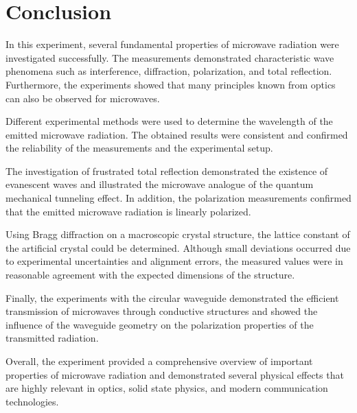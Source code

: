 \section{Conclusion}
\noindent
\setlength{\parindent}{0pt}


In this experiment, several fundamental properties of microwave radiation were investigated successfully. 
The measurements demonstrated characteristic wave phenomena such as interference, diffraction, polarization, 
and total reflection. Furthermore, the experiments showed that many principles known from optics can also be 
observed for microwaves.

Different experimental methods were used to determine the wavelength of the emitted microwave radiation. The 
obtained results were consistent and confirmed the reliability of the measurements and the experimental setup.

The investigation of frustrated total reflection demonstrated the existence of evanescent waves and illustrated 
the microwave analogue of the quantum mechanical tunneling effect. In addition, the polarization measurements 
confirmed that the emitted microwave radiation is linearly polarized.

Using Bragg diffraction on a macroscopic crystal structure, the lattice constant of the artificial crystal could 
be determined. Although small deviations occurred due to experimental uncertainties and alignment errors, the 
measured values were in reasonable agreement with the expected dimensions of the structure.

Finally, the experiments with the circular waveguide demonstrated the efficient transmission of microwaves 
through conductive structures and showed the influence of the waveguide geometry on the polarization properties 
of the transmitted radiation.

Overall, the experiment provided a comprehensive overview of important properties of microwave radiation and 
demonstrated several physical effects that are highly relevant in optics, solid state physics, and modern 
communication technologies.


